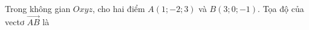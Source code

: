 \begin{ex}
Trong không gian $Oxyz$, cho hai điểm $A(1;-2;3)$ và $B(3;0;-1)$. Tọa độ của vectơ $\overrightarrow{AB}$ là
\end{ex}
